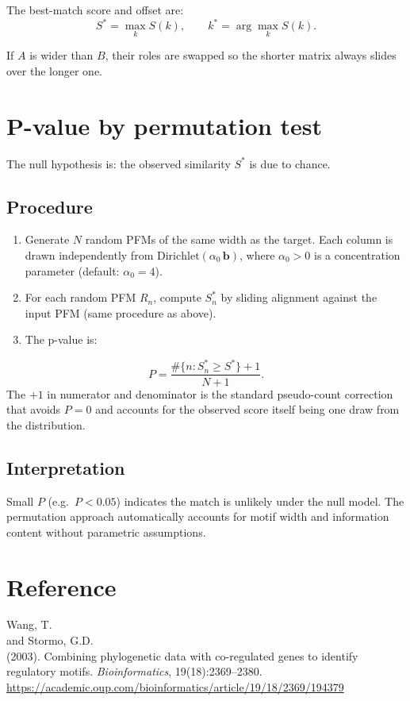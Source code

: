 \documentclass[11pt]{article}
\begin{document}
The best-match score and offset are:
\begin{equation}
  S^* = \max_{k} S(k), \qquad k^* = \arg\max_{k} S(k).
\end{equation}

If $A$ is wider than $B$, their roles are swapped so the shorter matrix
always slides over the longer one.

\section{P-value by permutation test}

The null hypothesis is: the observed similarity $S^*$ is due to chance.

\subsection{Procedure}

\begin{enumerate}[nosep]
  \item Generate $N$ random PFMs of the same width as the target.
        Each column is drawn independently from
        $\mathrm{Dirichlet}(\alpha_0\, \mathbf{b})$,
        where $\alpha_0 > 0$ is a concentration parameter
        (default: $\alpha_0 = 4$).
  \item For each random PFM $R_n$, compute $S_n^*$ by sliding alignment
        against the input PFM (same procedure as above).
  \item The p-value is:
\end{enumerate}
\begin{equation}
  P = \frac{\#\{n : S_n^* \ge S^*\} + 1}{N + 1}.
\end{equation}
The $+1$ in numerator and denominator is the standard pseudo-count
correction that avoids $P = 0$ and accounts for the observed score
itself being one draw from the distribution.

\subsection{Interpretation}

Small $P$ (e.g.\ $P < 0.05$) indicates the match is unlikely under the
null model.  The permutation approach automatically accounts for motif
width and information content without parametric assumptions.

\section*{Reference}

Wang, T.\\ and Stormo, G.D.\\ (2003).
Combining phylogenetic data with co-regulated genes to identify regulatory motifs.
\textit{Bioinformatics}, 19(18):2369--2380.
\\\url{https://academic.oup.com/bioinformatics/article/19/18/2369/194379}
\end{document}
